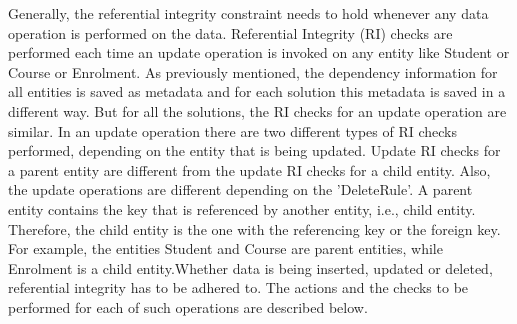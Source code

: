 Generally, the referential integrity constraint needs to hold whenever any data
operation is performed on the data. Referential Integrity (RI) checks are
performed each time an update operation is invoked on any entity like Student or
Course or Enrolment. As previously mentioned, the dependency information for all
entities is saved as metadata and for each solution this metadata is saved in a
different way. But for all the solutions, the RI checks for an update operation
are similar.
In an update operation there are two different types of RI checks performed,
depending on the entity that is being updated. Update RI checks for a parent
entity are different from the update RI checks for a child entity. Also, the
update operations are different depending on the 'DeleteRule'.
A parent entity contains the key that is referenced by another entity, i.e.,
child entity. Therefore, the child entity is the one with the referencing key or
the foreign key. For example, the entities Student and Course are parent
entities, while Enrolment is a child entity.Whether data is being inserted,
updated or deleted, referential integrity has to be adhered to. The actions and
the checks to be performed for each of such operations are described below.

